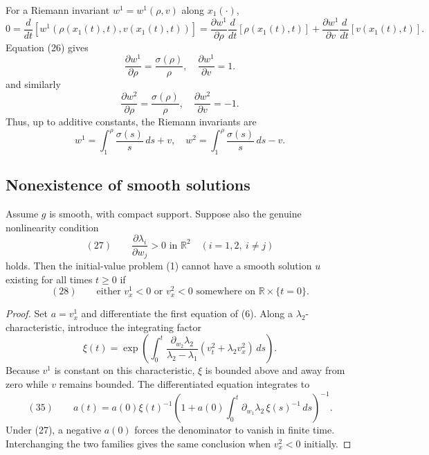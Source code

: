 \begin{example}
For a Riemann invariant $w^1=w^1(\rho,v)$ along $x_1(\cdot)$,
$$0 = \frac{d}{dt}[w^1(\rho(x_1(t),t),v(x_1(t),t))] = \frac{\partial w^1}{\partial\rho}\frac{d}{dt}[\rho(x_1(t),t)] + \frac{\partial w^1}{\partial v}\frac{d}{dt}[v(x_1(t),t)].$$
Equation (26) gives
$$\frac{\partial w^1}{\partial\rho} = \frac{\sigma(\rho)}{\rho}, \quad \frac{\partial w^1}{\partial v} = 1.$$
and similarly
$$\frac{\partial w^2}{\partial\rho} = \frac{\sigma(\rho)}{\rho}, \quad \frac{\partial w^2}{\partial v} = -1.$$
Thus, up to additive constants, the Riemann invariants are
$$w^1 = \int_1^\rho \frac{\sigma(s)}{s}\,ds + v, \quad w^2 = \int_1^\rho \frac{\sigma(s)}{s}\,ds - v.$$
\end{example}

\subsection{Nonexistence of smooth solutions}\label{sec:nonexistence-smooth-solutions-systems}

\begin{theorem}
\label{thm:riemann-invariants-blowup}
Assume $g$ is smooth, with compact support. Suppose also the genuine nonlinearity condition
$$(27) \qquad \frac{\partial\lambda_i}{\partial w_j} > 0 \text{ in } \mathbb{R}^2 \quad (i=1,2,\ i\neq j)$$
holds. Then the initial-value problem (1) cannot have a smooth solution $u$ existing for all times $t\geq 0$ if
$$(28) \qquad \text{either } v^1_x < 0 \text{ or } v^2_x < 0 \text{ somewhere on } \mathbb{R}\times\{t=0\}.$$
\end{theorem}

\begin{proof}
\sketch Set $a=v^1_x$ and differentiate the first equation of (6). Along a $\lambda_2$-characteristic, introduce the integrating factor
\[
\xi(t)=\exp\!\left(\int_0^t
\frac{\partial_{w_2}\lambda_2}{\lambda_2-\lambda_1}
(v^2_t+\lambda_2v^2_x)\,ds\right).
\]
Because $v^1$ is constant on this characteristic, $\xi$ is bounded above and away from zero while $v$ remains bounded. The differentiated equation integrates to
\[
(35)\qquad
a(t)=a(0)\xi(t)^{-1}
\left(1+a(0)\int_0^t\partial_{w_1}\lambda_2\,\xi(s)^{-1}\,ds\right)^{-1}.
\]
Under (27), a negative $a(0)$ forces the denominator to vanish in finite time. Interchanging the two families gives the same conclusion when $v^2_x<0$ initially.
\end{proof}

